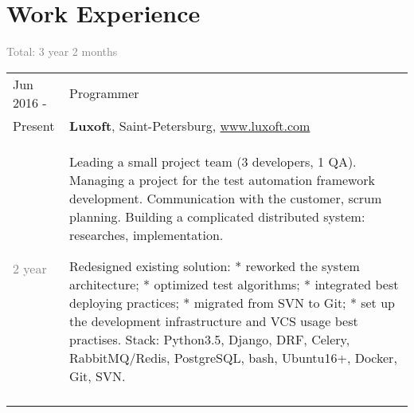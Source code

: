 \documentclass[a4paper,10pt]{article}
\begin{document}
\section{Work Experience}
\textcolor{gray}{Total: 3 year 2 months} \\
\begin{tabularx}{\textwidth}{lX}
	Jun 2016 -				&	Programmer \\
	Present					&	\textbf{Luxoft}, Saint-Petersburg,
								\href{www.luxoft.com}{www.luxoft.com} \\
	\textcolor{gray}
	{2 year}	
							&	\footnotesize{
									Leading a small project team (3 developers, 1 QA).\newline
									Managing a project for the test automation framework development.\newline
									Communication with the customer, scrum planning.\newline
									Building a complicated distributed system: researches, implementation.\newline\newline

									Redesigned existing solution:\newline
									* reworked the system architecture;\newline
									* optimized test algorithms;\newline
									* integrated best deploying practices;\newline
									* migrated from SVN to Git;\newline
									* set up the development infrastructure and VCS usage best practises.\newline\newline
									Stack: Python3.5, Django, DRF, Celery, RabbitMQ/Redis, PostgreSQL, bash, Ubuntu16+, Docker, Git, SVN.\newline
								} \\

	\multicolumn{2}{c}{}\\


\end{tabularx}
\end{document}
